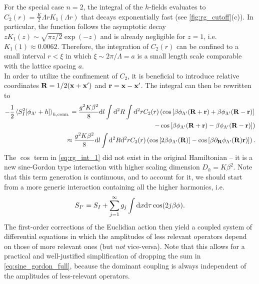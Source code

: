 For the special case $n=2$, the integral of the $h$-fields evaluates to $C_2(r)=\frac K2 \Lambda r K_1(\Lambda r)$ that decays exponentially fast (see \cref{fig:rg_cutoff}(c)).
In particular, the function follows the asymptotic decay $z K_1(z) \sim \sqrt{\pi z/2}\exp(-z)$ and is already negligible for $z=1$, i.e. $K_1(1)\approx0.0062$.
Therefore, the integration of $C_2(r)$ can be confined to a small interval $r<\xi$ in which $\xi\sim2\pi/\Lambda=a$ is a small length scale comparable with the lattice spacing $a$.
\\

In order to utilize the confinement of $C_2$, it is beneficial to introduce relative coordinates ${\bf R} = 1/2({\bf x}+{\bf x'})$ and ${\bf r} = {\bf x}-{\bf x'}$.
The integral can then be rewritten to
\begin{align}
    -\frac12\braket{S^2_I[\phi_{\Lambda'}+h]}_{h,{\rm conn.}}
    =
    \frac{g^2K\beta^2}8\mathrm d l\int\mathrm d^2R\int\mathrm d^2r
    C_2(r)
    \left(
        \cos\left[ \beta\phi_{\Lambda'}({\bf R}+{\bf r})+\beta\phi_{\Lambda'}({\bf R}-{\bf r}) \right]
        \right.
        \label{eq:rg_int_1}\\
        \left.-
        \cos\left[ \beta\phi_{\Lambda'}({\bf R}+{\bf r})-\beta\phi_{\Lambda'}({\bf R}-{\bf r}) \right]
    \right)
    \label{eq:rg_int_2}
    \\
    \approx
    \frac{g^2K\beta^2}{8}\mathrm d l\int\mathrm d^2R\mathrm d^2rC_2(r)
    \left(
        \cos\left[ 2\beta\phi_{\Lambda'}({\bf R}) \right]
        -
        \cos\left[ \beta\partial_{\bf R}\phi_{\Lambda'}({\bf R}){\bf r}) \right]
    \right).
    \label{eq:rg_int_rel_coords}
\end{align}
The $\cos$ term in \cref{eq:rg_int_1} did not exist in the original Hamiltonian -- it is a new sine-Gordon type interaction with higher scaling dimension $D_h = K\beta^2$.
Note that this term generation is continuous, and to account for it, we should start from a more generic interaction containing all the higher harmonics, i.e.
\begin{align}
    S_{I'} = S_I + \sum_{j=1}^\infty g_j\int\mathrm d x\mathrm d\tau\cos(2j\beta\phi).
    \label{eq:sine_gordon_full}
\end{align}
The first-order corrections of the Euclidian action then yield a coupled system of differential equations in which the amplitudes of less relevant operators depend on those of more relevant ones (but {\it not} vice-versa).
Note that this allows for a practical and well-justified simplification of dropping the sum in \cref{eq:sine_gordon_full}, because the dominant coupling is always independent of the amplitudes of less-relevant operators.
\\

